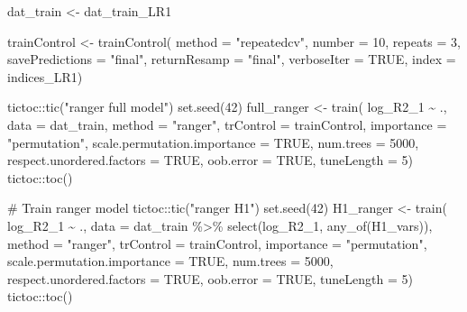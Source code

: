 \documentclass[
  letterpaper,
  DIV=11,
  numbers=noendperiod]{scrreprt}
\newenvironment{Shaded}{\begin{snugshade}}{\end{snugshade}}
\newcommand{\AttributeTok}[1]{\textcolor[rgb]{0.40,0.45,0.13}{#1}}
\newcommand{\CommentTok}[1]{\textcolor[rgb]{0.37,0.37,0.37}{#1}}
\newcommand{\ConstantTok}[1]{\textcolor[rgb]{0.56,0.35,0.01}{#1}}
\newcommand{\DecValTok}[1]{\textcolor[rgb]{0.68,0.00,0.00}{#1}}
\newcommand{\FunctionTok}[1]{\textcolor[rgb]{0.28,0.35,0.67}{#1}}
\newcommand{\NormalTok}[1]{\textcolor[rgb]{0.00,0.23,0.31}{#1}}
\newcommand{\OtherTok}[1]{\textcolor[rgb]{0.00,0.23,0.31}{#1}}
\newcommand{\SpecialCharTok}[1]{\textcolor[rgb]{0.37,0.37,0.37}{#1}}
\newcommand{\StringTok}[1]{\textcolor[rgb]{0.13,0.47,0.30}{#1}}
\begin{document}
\begin{Shaded}
\begin{Highlighting}[]
\NormalTok{dat\_train }\OtherTok{\textless{}{-}}\NormalTok{ dat\_train\_LR1}

\NormalTok{trainControl }\OtherTok{\textless{}{-}} \FunctionTok{trainControl}\NormalTok{(}
    \AttributeTok{method =} \StringTok{"repeatedcv"}\NormalTok{,}
    \AttributeTok{number =} \DecValTok{10}\NormalTok{,}
    \AttributeTok{repeats =} \DecValTok{3}\NormalTok{,}
    \AttributeTok{savePredictions =} \StringTok{"final"}\NormalTok{,}
    \AttributeTok{returnResamp =} \StringTok{"final"}\NormalTok{,}
    \AttributeTok{verboseIter =} \ConstantTok{TRUE}\NormalTok{,}
    \AttributeTok{index =}\NormalTok{ indices\_LR1)}

\NormalTok{tictoc}\SpecialCharTok{::}\FunctionTok{tic}\NormalTok{(}\StringTok{"ranger full model"}\NormalTok{)}
\FunctionTok{set.seed}\NormalTok{(}\DecValTok{42}\NormalTok{)}
\NormalTok{full\_ranger }\OtherTok{\textless{}{-}} \FunctionTok{train}\NormalTok{(}
\NormalTok{    log\_R2\_1 }\SpecialCharTok{\textasciitilde{}}\NormalTok{ .,}
    \AttributeTok{data =}\NormalTok{ dat\_train,}
    \AttributeTok{method =} \StringTok{"ranger"}\NormalTok{,}
    \AttributeTok{trControl =}\NormalTok{ trainControl,}
    \AttributeTok{importance =} \StringTok{"permutation"}\NormalTok{,}
    \AttributeTok{scale.permutation.importance =} \ConstantTok{TRUE}\NormalTok{,}
    \AttributeTok{num.trees =} \DecValTok{5000}\NormalTok{,}
    \AttributeTok{respect.unordered.factors =} \ConstantTok{TRUE}\NormalTok{,}
    \AttributeTok{oob.error =} \ConstantTok{TRUE}\NormalTok{,}
    \AttributeTok{tuneLength =} \DecValTok{5}\NormalTok{)}
\NormalTok{tictoc}\SpecialCharTok{::}\FunctionTok{toc}\NormalTok{()}


\CommentTok{\# Train ranger model}
\NormalTok{tictoc}\SpecialCharTok{::}\FunctionTok{tic}\NormalTok{(}\StringTok{"ranger H1"}\NormalTok{)}
\FunctionTok{set.seed}\NormalTok{(}\DecValTok{42}\NormalTok{)}
\NormalTok{H1\_ranger }\OtherTok{\textless{}{-}} \FunctionTok{train}\NormalTok{(}
\NormalTok{    log\_R2\_1 }\SpecialCharTok{\textasciitilde{}}\NormalTok{ .,}
    \AttributeTok{data =}\NormalTok{ dat\_train }\SpecialCharTok{\%\textgreater{}\%} \FunctionTok{select}\NormalTok{(log\_R2\_1, }\FunctionTok{any\_of}\NormalTok{(H1\_vars)),}
    \AttributeTok{method =} \StringTok{"ranger"}\NormalTok{,}
    \AttributeTok{trControl =}\NormalTok{ trainControl,}
    \AttributeTok{importance =} \StringTok{"permutation"}\NormalTok{,}
    \AttributeTok{scale.permutation.importance =} \ConstantTok{TRUE}\NormalTok{,}
    \AttributeTok{num.trees =} \DecValTok{5000}\NormalTok{,}
    \AttributeTok{respect.unordered.factors =} \ConstantTok{TRUE}\NormalTok{,}
    \AttributeTok{oob.error =} \ConstantTok{TRUE}\NormalTok{,}
    \AttributeTok{tuneLength =} \DecValTok{5}\NormalTok{)}
\NormalTok{tictoc}\SpecialCharTok{::}\FunctionTok{toc}\NormalTok{()}



\end{Highlighting}
\end{Shaded}
\end{document}
